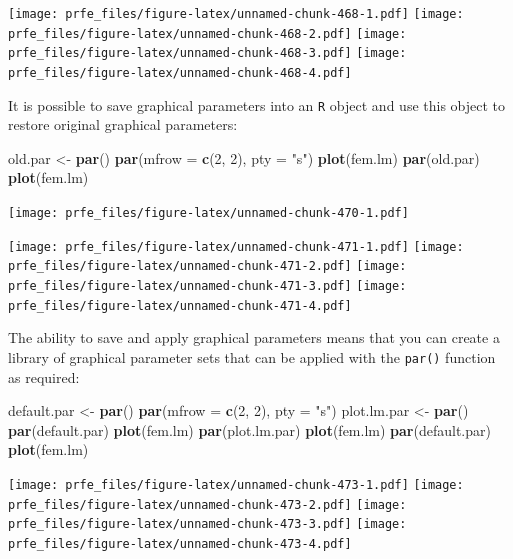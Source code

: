 \documentclass[12pt,a4paper]{book}
\newenvironment{Shaded}{\begin{snugshade}}{\end{snugshade}}
\newcommand{\DataTypeTok}[1]{\textcolor[rgb]{0.13,0.29,0.53}{#1}}
\newcommand{\DecValTok}[1]{\textcolor[rgb]{0.00,0.00,0.81}{#1}}
\newcommand{\KeywordTok}[1]{\textcolor[rgb]{0.13,0.29,0.53}{\textbf{#1}}}
\newcommand{\NormalTok}[1]{#1}
\newcommand{\StringTok}[1]{\textcolor[rgb]{0.31,0.60,0.02}{#1}}
\theoremstyle{definition}
\theoremstyle{definition}
\theoremstyle{definition}
\theoremstyle{remark}
\begin{document}
\texttt{[image: prfe\_files/figure-latex/unnamed-chunk-468-1.pdf]}
\texttt{[image: prfe\_files/figure-latex/unnamed-chunk-468-2.pdf]}
\texttt{[image: prfe\_files/figure-latex/unnamed-chunk-468-3.pdf]}
\texttt{[image: prfe\_files/figure-latex/unnamed-chunk-468-4.pdf]}

It is possible to save graphical parameters into an \texttt{R} object
and use this object to restore original graphical parameters:

\begin{Shaded}
\begin{Highlighting}[]
\NormalTok{old.par <-}\StringTok{ }\KeywordTok{par}\NormalTok{()}
\KeywordTok{par}\NormalTok{(}\DataTypeTok{mfrow =} \KeywordTok{c}\NormalTok{(}\DecValTok{2}\NormalTok{, }\DecValTok{2}\NormalTok{), }\DataTypeTok{pty =} \StringTok{"s"}\NormalTok{)}
\KeywordTok{plot}\NormalTok{(fem.lm)}
\KeywordTok{par}\NormalTok{(old.par)}
\KeywordTok{plot}\NormalTok{(fem.lm)}
\end{Highlighting}
\end{Shaded}

\texttt{[image: prfe\_files/figure-latex/unnamed-chunk-470-1.pdf]}

\texttt{[image: prfe\_files/figure-latex/unnamed-chunk-471-1.pdf]}
\texttt{[image: prfe\_files/figure-latex/unnamed-chunk-471-2.pdf]}
\texttt{[image: prfe\_files/figure-latex/unnamed-chunk-471-3.pdf]}
\texttt{[image: prfe\_files/figure-latex/unnamed-chunk-471-4.pdf]}

The ability to save and apply graphical parameters means that you can
create a library of graphical parameter sets that can be applied with
the \texttt{par()} function as required:

\begin{Shaded}
\begin{Highlighting}[]
\NormalTok{default.par <-}\StringTok{ }\KeywordTok{par}\NormalTok{()}
\KeywordTok{par}\NormalTok{(}\DataTypeTok{mfrow =} \KeywordTok{c}\NormalTok{(}\DecValTok{2}\NormalTok{, }\DecValTok{2}\NormalTok{), }\DataTypeTok{pty =} \StringTok{"s"}\NormalTok{)}
\NormalTok{plot.lm.par <-}\StringTok{ }\KeywordTok{par}\NormalTok{()}
\KeywordTok{par}\NormalTok{(default.par)}
\KeywordTok{plot}\NormalTok{(fem.lm)}
\KeywordTok{par}\NormalTok{(plot.lm.par)}
\KeywordTok{plot}\NormalTok{(fem.lm)}
\KeywordTok{par}\NormalTok{(default.par)}
\KeywordTok{plot}\NormalTok{(fem.lm)}
\end{Highlighting}
\end{Shaded}

\texttt{[image: prfe\_files/figure-latex/unnamed-chunk-473-1.pdf]}
\texttt{[image: prfe\_files/figure-latex/unnamed-chunk-473-2.pdf]}
\texttt{[image: prfe\_files/figure-latex/unnamed-chunk-473-3.pdf]}
\texttt{[image: prfe\_files/figure-latex/unnamed-chunk-473-4.pdf]}
\end{document}
